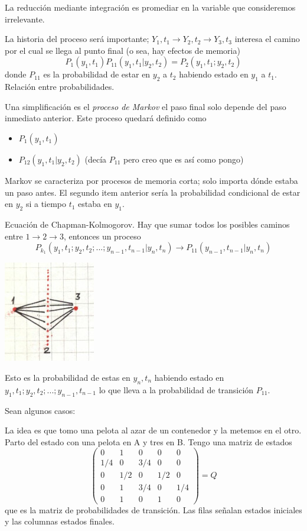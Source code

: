 \documentclass[10pt,oneside]{CBFT_book}
\begin{document}
La reducción mediante integración es promediar en la variable que consideremos irrelevante.

La historia del proceso será importante; $Y_1,t_1 \to Y_2,t_2 \to Y_3,t_3 $ interesa el
camino por el cual se llega al punto final (o sea, hay efectos de memoria)
\[
	P_1(y_1,t_1) P_{11}(y_1,t_1|y_2,t_2) = P_2(y_1,t_1;y_2,t_2)
\]
donde $P_{11}$ es la probabilidad de estar en $y_2$ a $t_2$ habiendo estado en $y_1$ a $t_1$.
Relación entre probabilidades.

Una simplificación es el {\it proceso de Markov} el paso final solo depende del paso inmediato
anterior. Este proceso quedará definido como
\begin{itemize}
	\item $ P_1(y_1,t_1) $
	\item $ P_{12}(y_1,t_1|y_2,t_2) $ (decía $P_{11}$ pero creo que es así como pongo)
\end{itemize}
Markov se caracteriza por procesos de memoria corta; solo importa dónde estaba un paso antes.
El segundo item anterior sería la probabilidad condicional de estar en $y_2$ si a tiempo $t_1$ estaba
en $y_1$.

Ecuación de Chapman-Kolmogorov. Hay que sumar todos los posibles caminos entre $1 \to 2 \to 3$,
entonces un proceso 
\[
	P_{k_1}(y_1,t_1;y_2,t_2;...;y_{n-1},t_{n-1}|y_n,t_n) \to P_{11}(y_{n-1},t_{n-1}|y_n,t_n)
\]

\includegraphics[width=0.30\textwidth]{images/1606329125.jpg}

Esto es la probabilidad de estas en $y_n,t_n$ habiendo estado en $y_1,t_1;y_2,t_2;...;y_{n-1},t_{n-1}$
lo que lleva a la probabilidad de transición $P_{11}$.

Sean algunos casos:

La idea es que tomo una pelota al azar de un contenedor y la metemos en el otro.
Parto del estado con una pelota en A y tres en B.
Tengo una matriz de estados
\[
	\begin{pmatrix}
		0 & 1 & 0 & 0 & 0 \\
		1/4 & 0 & 3/4 & 0 & 0 \\
		0 & 1/2 & 0 & 1/2 & 0 \\
		0 & 1 & 3/4 & 0 & 1/4 \\
		0 & 1 & 0 & 1 & 0
	\end{pmatrix} = Q
\]
que es la matriz de probabilidades de transición. Las filas señalan estados iniciales y
las columnas estados finales.
\end{document}
